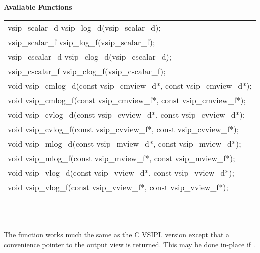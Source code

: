 \\\cvsiplh
\\ \hspace*{.8cm} \vspace*{.1cm} \textbf{Available Functions }
\\ \hspace*{1.1cm} {
\ttfamily
\begin{tabular}[H]{l}
vsip\_scalar\_d vsip\_log\_d(vsip\_scalar\_d);\\
vsip\_scalar\_f vsip\_log\_f(vsip\_scalar\_f);\\
vsip\_cscalar\_d vsip\_clog\_d(vsip\_cscalar\_d);\\
vsip\_cscalar\_f vsip\_clog\_f(vsip\_cscalar\_f);\\
void vsip\_cmlog\_d(const vsip\_cmview\_d*, const vsip\_cmview\_d*);\\
void vsip\_cmlog\_f(const vsip\_cmview\_f*, const vsip\_cmview\_f*);\\
void vsip\_cvlog\_d(const vsip\_cvview\_d*, const vsip\_cvview\_d*);\\
void vsip\_cvlog\_f(const vsip\_cvview\_f*, const vsip\_cvview\_f*);\\
void vsip\_mlog\_d(const vsip\_mview\_d*, const vsip\_mview\_d*);\\
void vsip\_mlog\_f(const vsip\_mview\_f*, const vsip\_mview\_f*);\\
void vsip\_vlog\_d(const vsip\_vview\_d*, const vsip\_vview\_d*);\\
void vsip\_vlog\_f(const vsip\_vview\_f*, const vsip\_vview\_f*);\\
\end{tabular}
}
\\\pyjvsiph
{}
\\\hspace*{1.2cm}\parbox{10.8cm}{\vspace*{.1cm}The  function works much the same as the C VSIPL version except that a convenience pointer to the output view is returned. This may be done in-place if .}
